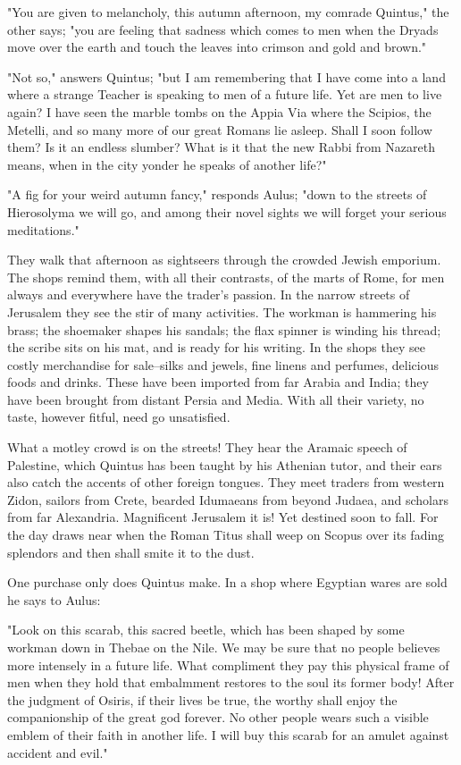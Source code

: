 "You are given to melancholy, this autumn afternoon, my comrade
Quintus," the other says; "you are feeling that sadness which comes
to men when the Dryads move over the earth and touch the leaves
into crimson and gold and brown."

"Not so," answers Quintus; "but I am remembering that I have come
into a land where a strange Teacher is speaking to men of a future
life.  Yet are men to live again?  I have seen the marble tombs on
the Appia Via where the Scipios, the Metelli, and so many more of
our great Romans lie asleep.  Shall I soon follow them?  Is it an
endless slumber?  What is it that the new Rabbi from Nazareth
means, when in the city yonder he speaks of another life?"

"A fig for your weird autumn fancy," responds Aulus; "down to the
streets of Hierosolyma we will go, and among their novel sights we
will forget your serious meditations."


They walk that afternoon as sightseers through the crowded Jewish
emporium.  The shops remind them, with all their contrasts, of the
marts of Rome, for men always and everywhere have the trader's
passion.  In the narrow streets of Jerusalem they see the stir of
many activities.  The workman is hammering his brass; the shoemaker
shapes his sandals; the flax spinner is winding his thread; the
scribe sits on his mat, and is ready for his writing.  In the shops
they see costly merchandise for sale--silks and jewels, fine linens
and perfumes, delicious foods and drinks.  These have been imported
from far Arabia and India; they have been brought from distant
Persia and Media.  With all their variety, no taste, however
fitful, need go unsatisfied.

What a motley crowd is on the streets!  They hear the Aramaic
speech of Palestine, which Quintus has been taught by his Athenian
tutor, and their ears also catch the accents  of other  foreign
tongues.  They meet traders from western Zidon, sailors from Crete,
bearded Idumaeans from beyond Judaea, and scholars from far
Alexandria.  Magnificent Jerusalem it is!  Yet destined soon to
fall.  For the day draws near when the Roman Titus shall weep on
Scopus over its fading splendors and then shall smite it to the
dust.

One purchase only does Quintus make.  In a shop where Egyptian
wares are sold he says to Aulus:

"Look on this scarab, this sacred beetle, which has been shaped by
some workman down in Thebae on the Nile.  We may be sure that no
people believes more intensely in a future life.  What compliment
they pay this physical frame of men when they hold that embalmment
restores to the soul its former body!  After the judgment of
Osiris, if their lives be true, the worthy shall enjoy the
companionship of the great god forever.  No other people wears such
a visible emblem of their faith in another life.  I will buy this
scarab for an amulet against accident and evil."



